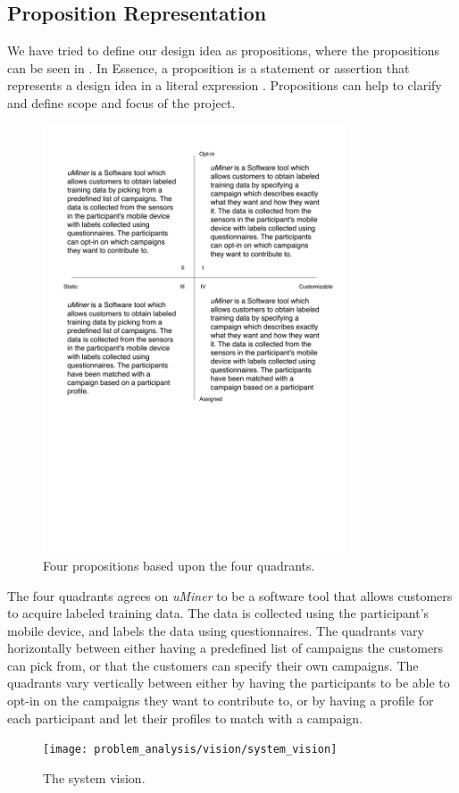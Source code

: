 \subsection{Proposition Representation}
\label{sub:proposition_representation}

We have tried to define our design idea as propositions, where the propositions can be seen in . 
In Essence, a proposition is a statement or assertion that represents a design idea in a literal expression \parencite{essence_book}. Propositions can help to clarify and define scope and focus of the project.

\begin{figure}[!htbp]
	\centering
	\includegraphics[width=0.8\textwidth]{graphic/problem_analysis/vision/propositions.pdf}
	\caption{Four propositions based upon the four quadrants.}
	\label{fig:proposition}
\end{figure}
\FloatBarrier

The four quadrants agrees on \emph{uMiner} to be a software tool that allows customers to acquire labeled training data. The data is collected using the participant's mobile device, and labels the data using questionnaires. The quadrants vary horizontally between either having a predefined list of campaigns the customers can pick from, or that the customers can specify their own campaigns. The quadrants vary vertically between either by having the participants to be able to opt-in on the campaigns they want to contribute to, or by having a profile for each participant and let their profiles to match with a campaign.

\begin{figure}[!htbp]
    \centering
    \texttt{[image: problem\_analysis/vision/system\_vision]}
    \caption{The system vision.}
    \label{fig:system_vision}
\end{figure}
\FloatBarrier